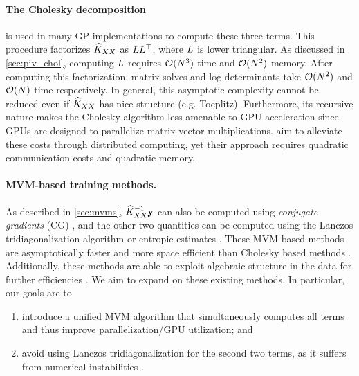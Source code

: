 \paragraph{The Cholesky decomposition} is used in many GP implementations to compute these three terms.
This procedure factorizes $\widehat{K}_{XX}$ as $L L^\top$, where $L$ is lower triangular.
As discussed in \cref{sec:piv_chol}, computing $L$ requires $\bigo{N^3}$ time and $\bigo{N^2}$ memory.
After computing this factorization, matrix solves and log determinants take $\bigo{N^2}$ and $\bigo{N}$ time respectively.
In general, this asymptotic complexity cannot be reduced even if $\widehat{K}_{XX}$ has nice structure (e.g. Toeplitz).
Furthermore, its recursive nature makes the Cholesky algorithm less amenable to GPU acceleration since GPUs are designed to parallelize matrix-vector multiplications.
\citet{nguyen2019exact} aim to alleviate these costs through distributed computing, yet their approach requires quadratic communication costs and quadratic memory.

\paragraph{MVM-based training methods.}
As described in \cref{sec:mvms},
$\widehat{K}_{XX}^{-1}\mathbf{y}$ can also be computed using \emph{conjugate gradients} (CG) \cite{cunningham2008fast,cutajar2016preconditioning},
and the other two quantities can be computed using the Lanczos tridiagonalization algorithm \cite{ubaru2017fast,dong2017scalable} or entropic estimates \cite{fitzsimons2016improved}.
These MVM-based methods are asymptotically faster and more space efficient than Cholesky based methods \cite{wilson2015kernel,dong2017scalable}.
Additionally, these methods are able to exploit algebraic structure in the data for further efficiencies \cite{cunningham2008fast,saatcci2012scalable,wilson2015kernel}.
We aim to expand on these existing methods.
In particular, our goals are to
\begin{enumerate}
  \item introduce a unified MVM algorithm that simultaneously computes all terms and thus improve parallelization/GPU utilization; and
  \item avoid using Lanczos tridiagonalization for the second two terms, as it suffers from numerical instabilities \cite{golub2012matrix}.
\end{enumerate}

